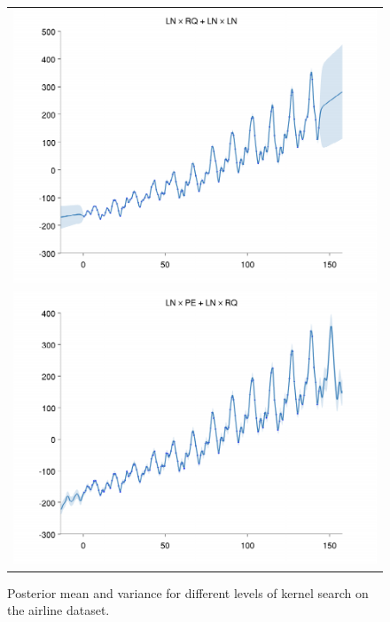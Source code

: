 \documentclass[twoside]{article}
\begin{document}
\begin{figure}[h!]
\begin{tabular}{c}
 \includegraphics[width=\wag,height=\hag]{../figures/decomposition/01-airline-months_max_level_2/01-airline-months_all} \\
 \includegraphics[width=\wag,height=\hag]{../figures/decomposition/01-airline-months_max_level_3/01-airline-months_all}
\end{tabular}
\caption{Posterior mean and variance for different levels of kernel search on the airline dataset.}
\label{fig:airline_grow}
\end{figure}
\end{document}
